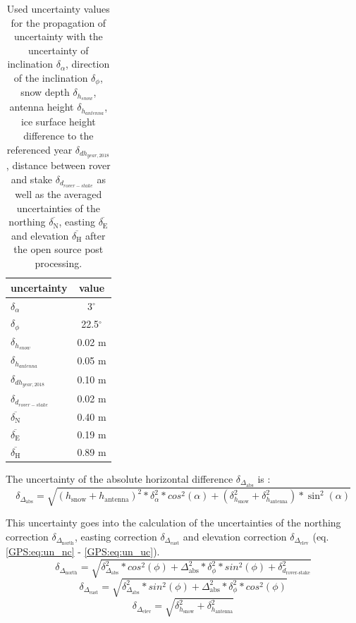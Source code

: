 \begin{table}[H]
	\caption{Used uncertainty values for the propagation of uncertainty with the uncertainty of inclination $ \delta_{\alpha} $, direction of the inclination $ \delta_{\phi} $, snow depth $ \delta_{h_{snow}}$, antenna height $ \delta_{h_{antenna}} $, ice surface height difference to the referenced year $ \delta_{dh_{year,2018}}$, distance between rover and stake $ \delta_{d_{rover-stake}} $ as well as the averaged uncertainties of the northing $ \overline{\delta_{\text{N}}} $, easting $ \overline{\delta_{\text{E}}} $ and elevation $ \overline{\delta_{\text{H}}} $ after the open source post processing.}
	\centering
	\begin{tabular}{lc}
	\toprule
        uncertainty &  value \\
	\midrule
    $ \delta_{\alpha} $ &  3$^{\circ}$ \\
    $ \delta_{\phi} $ &  22.5$^{\circ}$ \\
    $ \delta_{h_{snow}}$ &  0.02 m \\
    $ \delta_{h_{antenna}} $ &  0.05 m \\
    $ \delta_{dh_{year,2018}} $ &  0.10 m \\
    $ \delta_{d_{rover-stake}} $ &  0.02 m \\
    $ \overline{\delta_{\text{N}}} $ & 0.40 m \\
    $ \overline{\delta_{\text{E}}} $ & 0.19 m \\
    $ \overline{\delta_{\text{H}}} $ & 0.89 m \\
    \bottomrule
	\end{tabular}
	\label{GPS:tab:errors}
\end{table} 

The uncertainty of the absolute horizontal difference $\delta_{\Delta_{\text{abs}}}$ is :
\begin{equation}
	\delta_{\Delta_{\text{abs}}} = \sqrt{(h_{\text{snow}} + h_{\text{antenna}})^2 * \delta_{\alpha}^2 * cos^2(\alpha) + (\delta_{h_{\text{snow}}}^2 + \delta_{h_{\text{antenna}}}^2) * \sin^2(\alpha)}
\end{equation}

This uncertainty goes into the calculation of the uncertainties of the northing correction $\delta_{\Delta_{\text{north}}}$, easting correction $\delta_{\Delta_{\text{east}}}$ and elevation correction $\delta_{\Delta_{\text{elev}}}$ (eq. \ref{GPS:eq:un_nc} - \ref{GPS:eq:un_uc}). 
\begin{equation} \label{GPS:eq:un_nc}
	\delta_{\Delta_{\text{north}}} = \sqrt{\delta_{\Delta_{\text{abs}}}^2 * cos^2(\phi) + \Delta_{\text{abs}}^2 * \delta_{\phi}^2 * sin^2(\phi) + \delta_{d_{\text{rover-stake}}}^2}
\end{equation}
\begin{equation} \label{GPS:eq:un_ec}
	\delta_{\Delta_{\text{east}}} = \sqrt{\delta_{\Delta_{\text{abs}}}^2 * sin^2(\phi) + \Delta_{\text{abs}}^2 * \delta_{\phi}^2 * cos^2(\phi)}
\end{equation}
\begin{equation} \label{GPS:eq:un_uc}
\delta_{\Delta_{\text{elev}}} = \sqrt{\delta_{h_{\text{snow}}}^2 + \delta_{h_{\text{antenna}}}^2}
\end{equation}
	
